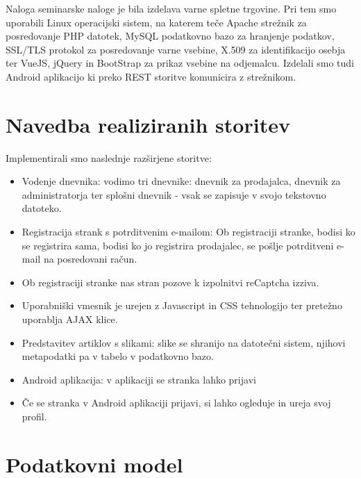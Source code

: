 \documentclass[a4paper,12pt]{report}
\begin{document}
Naloga seminarske naloge je bila izdelava varne spletne trgovine. Pri tem smo uporabili Linux operacijski sistem, na katerem teče Apache strežnik za posredovanje PHP datotek, MySQL podatkovno bazo za hranjenje podatkov, SSL/TLS protokol za posredovanje varne vsebine, X.509 za identifikacijo osebja ter VueJS, jQuery in BootStrap za prikaz vsebine na odjemalcu. Izdelali smo tudi Android aplikacijo ki preko REST storitve komunicira z strežnikom.


\chapter{Navedba realiziranih storitev}

Implementirali smo naslednje razširjene storitve:

\begin{itemize}
\item Vodenje dnevnika: vodimo tri dnevnike: dnevnik za prodajalca, dnevnik za administratorja ter splošni dnevnik - vsak se zapisuje v svojo tekstovno datoteko.
\item Registracija strank s potrditvenim e-mailom: Ob registraciji stranke, bodisi ko se registrira sama, bodisi ko jo registrira prodajalec, se pošlje potrditveni e-mail na posredovani račun.
\item Ob registraciji stranke nas stran pozove k izpolnitvi reCaptcha izziva.
\item Uporabniški vmesnik je urejen z Javascript in CSS tehnologijo ter pretežno uporablja AJAX klice.
\item Predstavitev artiklov s slikami: slike se shranijo na datotečni sistem, njihovi metapodatki pa v tabelo v podatkovno bazo.
\item Android aplikacija: v aplikaciji se stranka lahko prijavi
\item Če se stranka v Android aplikaciji prijavi, si lahko ogleduje in ureja svoj profil.
\end{itemize}



\chapter{Podatkovni model}
\end{document}
